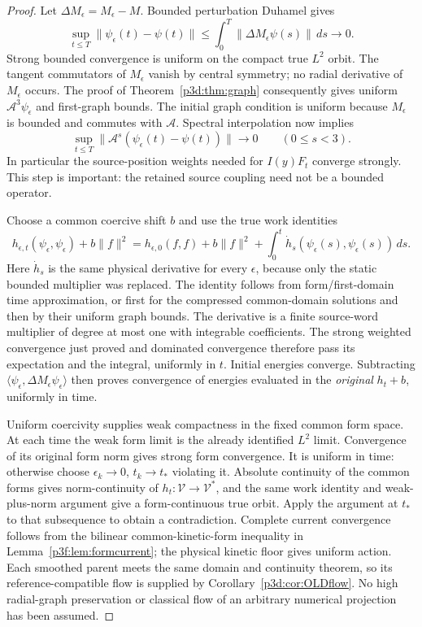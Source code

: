 \documentclass[11pt]{article}
\numberwithin{equation}{section}
\theoremstyle{definition}
\theoremstyle{remark}
\begin{document}
\begin{proof}
Let $\Delta M_\epsilon=M_\epsilon-M$. Bounded perturbation Duhamel gives
\[
 \sup_{t\leq T}\|\psi_\epsilon(t)-\psi(t)\|
 \leq\int_0^T\|\Delta M_\epsilon\psi(s)\|\,ds\longrightarrow0.
\]
Strong bounded convergence is uniform on the compact true $L^2$ orbit.
The tangent commutators of $M_\epsilon$ vanish by central symmetry;
no radial derivative of $M_\epsilon$ occurs. The proof of
Theorem~\ref{p3d:thm:graph} consequently gives uniform
$\mathcal A^3\psi_\epsilon$ and first-graph bounds. The initial graph
condition is uniform because $M_\epsilon$ is bounded and commutes
with $\mathcal A$. Spectral interpolation now implies
\[
 \sup_{t\leq T}
 \|\mathcal A^s(\psi_\epsilon(t)-\psi(t))\|\to0
 \qquad(0\leq s<3).
\]
In particular the source-position weights needed for
$I(y)F_t$ converge strongly. This step is important: the retained
source coupling need not be a bounded operator.

Choose a common coercive shift $b$ and use the true work identities
\[
 h_{\epsilon,t}(\psi_\epsilon,\psi_\epsilon)+b\|f\|^2
 =h_{\epsilon,0}(f,f)+b\|f\|^2+
   \int_0^t\dot h_s(\psi_\epsilon(s),\psi_\epsilon(s))\,ds .
\]
Here $\dot h_s$ is the same physical derivative for every $\epsilon$,
because only the static bounded multiplier was replaced.
The identity follows from form/first-domain time approximation, or
first for the compressed common-domain solutions and then by their
uniform graph bounds. The derivative is a finite source-word
multiplier of degree at most one with integrable coefficients.
The strong weighted convergence just proved and dominated convergence
therefore pass its expectation and the integral, uniformly in $t$.
Initial energies converge. Subtracting
$\langle\psi_\epsilon,\Delta M_\epsilon\psi_\epsilon\rangle$
then proves convergence of energies evaluated in the \emph{original}
$h_t+b$, uniformly in time.

Uniform coercivity supplies weak compactness in the fixed common form
space. At each time the weak form limit is the already identified
$L^2$ limit. Convergence of its original form norm gives strong form
convergence. It is uniform in time: otherwise choose
$\epsilon_k\to0$, $t_k\to t_*$ violating it. Absolute continuity of the
common forms gives norm-continuity of $h_t:\mathcal V\to\mathcal V^*$,
and the same work identity and weak-plus-norm argument give a
form-continuous true orbit. Apply the argument at $t_*$ to that
subsequence to obtain a contradiction.
Complete current convergence follows from the bilinear
common-kinetic-form inequality in Lemma~\ref{p3f:lem:formcurrent};
the physical kinetic floor gives uniform action.
Each smoothed parent meets the same domain and continuity theorem,
so its reference-compatible flow is supplied by
Corollary~\ref{p3d:cor:OLDflow}. No high radial-graph preservation or
classical flow of an arbitrary numerical projection has been assumed.
\end{proof}
\end{document}
